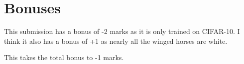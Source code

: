 \documentclass{article}
\begin{document}
\section*{Bonuses}
This submission has a bonus of -2 marks as it is only trained on CIFAR-10. I think it also has a bonus of +1 as nearly all the winged horses are white.

This takes the total bonus to -1 marks.

\printbibliography
\end{document}
